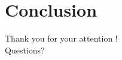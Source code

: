 \documentclass[10pt]{beamer}
\begin{document}




\section{Conclusion}




\begin{frame}[standout]
 Thank you for your attention ! \\
 \vspace{3em}
  Questions?
\end{frame}

%
%  
%  
\end{document}
